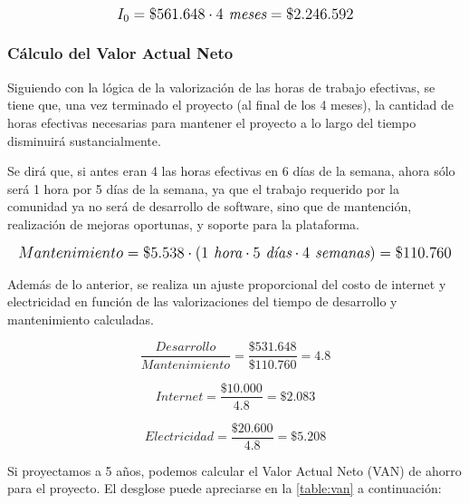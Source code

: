 \[
\mathlarger{
	{I_0} = \$561.648 \cdot 4\textit{ meses}= \$2.246.592
}
\]

\subsubsection{Cálculo del Valor Actual Neto}
Siguiendo con la lógica de la valorización de las horas de trabajo efectivas, se tiene que, una vez terminado el proyecto (al final de los 4 meses), la cantidad de horas efectivas necesarias para mantener el proyecto a lo largo del tiempo disminuirá sustancialmente.

Se dirá que, si antes eran 4 las horas efectivas en 6 días de la semana, ahora sólo será 1 hora por 5 días de la semana, ya que el trabajo requerido por la comunidad ya no será de desarrollo de software, sino que de mantención, realización de mejoras oportunas, y soporte para la plataforma.

\[
\mathlarger{
	Mantenimiento = \$5.538 \cdot \left(1 \textit{ hora}\cdot5 \textit{ días}\cdot4 \textit{ semanas}\right) = \$110.760
}
\]

Además de lo anterior, se realiza un ajuste proporcional del costo de internet y electricidad en función de las valorizaciones del tiempo de desarrollo y mantenimiento calculadas.

\[
\frac{Desarrollo}{Mantenimiento} = \frac{\$531.648}{\$110.760} = 4.8
\]

\[
Internet = \frac{\$10.000}{4.8} = \$2.083
\]

\[
Electricidad = \frac{\$20.600}{4.8} = \$5.208
\]

Si proyectamos a 5 años, podemos calcular el Valor Actual Neto (VAN) de ahorro para el proyecto. El desglose puede apreciarse en la \autoref{table:van} a continuación:


